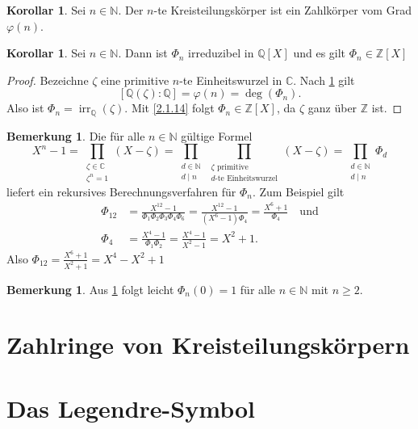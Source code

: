 \documentclass[
twoside=semi,
fontsize=12,
DIV=12, 
cleardoublepage=current,
leqno,
headings=optiontoheadandtoc, 
toc=idx
]{scrbook}
\newcommand{\N}{\mathbb{N}}
\newcommand{\Z}{\mathbb{Z}}
\newcommand{\Q}{\mathbb{Q}}
\newcommand{\C}{\mathbb{C}}
\DeclareMathOperator{\irr}{irr}
\theoremstyle{definition}
\newtheorem{bemerkung}[definition]{Bemerkung}
\newtheorem{korollar}[definition]{Korollar}
\begin{document}
 	\begin{korollar}\label{4.1.12}\hfill\newline
 		Sei $n \in \N$. Der $n$-te Kreisteilungsk\"orper ist ein Zahlk\"orper vom Grad $\varphi(n)$.
 	\end{korollar}
 
 	\begin{korollar}\label{4.1.13}\hfill\newline
 		Sei $n \in \N$. Dann ist $\Phi_n$ irreduzibel in $\Q[X]$ und es gilt $\Phi_n \in \Z[X]$
 		
 		\begin{proof}
 			Bezeichne $\zeta$ eine primitive $n$-te Einheitswurzel in $\C$. Nach \ref{4.1.12} gilt
 				\[[\Q(\zeta):\Q] = \varphi(n) = \deg(\Phi_n).\]
 			Also ist $\Phi_n = \irr_\Q(\zeta)$. Mit \ref{2.1.14} folgt $\Phi_n \in \Z[X]$, da $\zeta$ ganz \"uber $\Z$ ist.
 		\end{proof}
 	\end{korollar}
 	
 	\begin{bemerkung}\label{4.1.14}\hfill\newline
 		Die f\"ur alle $n \in \N$ g\"ultige Formel
 			\[X^n-1 = \prod_{\substack{\zeta \in \C\\\zeta^n = 1}}(X-\zeta) = \prod_{\substack{d \in \N\\ d\mid n}}\prod_{\substack{\zeta \textrm{ primitive}\\ d\textrm{-te Einheitswurzel}}}(X-\zeta) = \prod_{\substack{d \in \N\\d\mid n}}\Phi_d\]
 		liefert ein rekursives Berechnungsverfahren f\"ur $\Phi_n$. Zum Beispiel gilt
 		\begin{align*}
 			\Phi_{12} &= \frac{X^{12}-1}{\Phi_1\Phi_2\Phi_3\Phi_4\Phi_6} = \frac{X^{12}-1}{(X^6-1)\Phi_4} = \frac{X^6+1}{\Phi_4} \quad \textrm{und}\\
 			\Phi_4 &= \frac{X^4-1}{\Phi_1\Phi_2} = \frac{X^4-1}{X^2-1} = X^2+1.
 		\end{align*}
 		Also $\Phi_{12} = \frac{X^6+1}{X^2+1} = X^4-X^2+1$
 	\end{bemerkung}
 	
 	\begin{bemerkung}\label{4.1.15}\hfill\newline
 		Aus \ref{4.1.14} folgt leicht $\Phi_n(0) = 1$ f\"ur alle $n \in \N$ mit $n \geq 2$.
 	\end{bemerkung}
 
 	\newpage
 	\section{Zahlringe von Kreisteilungsk\"orpern}\thispagestyle{sectionstart}
 	
 	\newpage
 	\section{Das Legendre-Symbol}\thispagestyle{sectionstart}
\backmatter
\printindex
\end{document}
